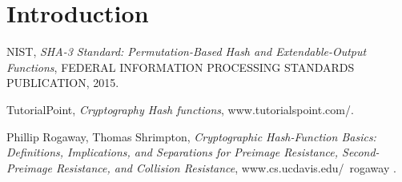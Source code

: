 \documentclass[a4paper,10pt]{article}
\title{}
\author{}
\date{\today}
\begin{document}
\maketitle
\tableofcontents
\newpage
\section{Introduction}

\begin{thebibliography}{9}

NIST,
\textit{SHA-3 Standard: Permutation-Based Hash and Extendable-Output Functions},
FEDERAL INFORMATION PROCESSING STANDARDS PUBLICATION,
2015.

TutorialPoint,
\textit{Cryptography Hash functions},
www.tutorialspoint.com/.

Phillip Rogaway, Thomas Shrimpton,
\textit{Cryptographic Hash-Function Basics: Definitions, Implications, and Separations for Preimage Resistance, Second-Preimage Resistance, and Collision Resistance},
www.cs.ucdavis.edu/~rogaway .

\end{thebibliography}
\end{document}
